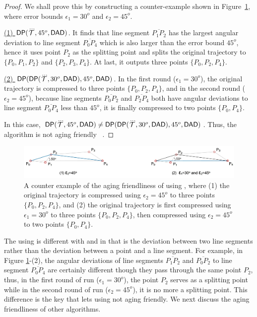 \begin{proof}
	We shall prove this by constructing a counter-example shown in Figure~\ref{fig:aging-dp-dad}, where error bounds $\epsilon_1 =30^o$ and $\epsilon_2=45^o$.
	
	\underline{(1) ${{\mathsf{DP}}}(\dddot{\mathcal{T}}, 45^o, {\mathsf{DAD}})$}. It finds that line segment $\overline{P_1P_2}$ has the largest angular deviation to line segment $\overline{P_0P_4}$ which is also larger than the error bound $45^o$, hence it uses point $P_2$ as the splitting point and splits the original trajectory to $\{P_0, P_1, P_2\}$ and $\{P_2, P_3, P_4\}$. At last, it outputs three points $\{P_0, P_2, P_4\}$.
	
	\underline{(2) ${{\mathsf{DP}}}({\mathsf{DP}}(\dddot{\mathcal{T}}, 30^o, {\mathsf{DAD}}), 45^o, {\mathsf{DAD}})$}. In the first round ($\epsilon_1=30^o$), the original trajectory is compressed to three points $\{P_0, P_2, P_4\}$, and in the second round ($\epsilon_2=45^o$), because line segments  $\overline{P_0P_2}$ and $\overline{P_2P_4}$ both have angular deviations to line segment $\overline{P_0P_4}$ less than $45^o$, it is finally compressed to two points $\{P_0, P_4\}$.
	
	In this case, ${{\mathsf{DP}}}(\dddot{\mathcal{T}}, 45^o, {\mathsf{DAD}}) \ne {{\ensuremath {\mathsf{DP}}}}({\mathsf{DP}}(\dddot{\mathcal{T}}, 30^o, {\mathsf{DAD}}), 45^o, {\mathsf{DAD}})$. Thus, the \dpa algorithm is not aging friendly \wrt~\dad.
\end{proof}

\begin{figure}
	\centering
	\includegraphics[scale=0.66]{Figures/Fig-aging-dp.jpg}
	
	\caption{\small A counter example of the aging friendliness of \dpa using \dad, where (1) the original trajectory is compressed using $\epsilon_2=45^o$ to three points $\{P_0, P_2, P_4\}$, and (2) the original trajectory is first compressed using $\epsilon_1=30^o$ to three points $\{P_0, P_2, P_4\}$, then compressed using $\epsilon_2=45^o$ to two points $\{P_0, P_4\}$. }
	\vspace{-1ex}
	\label{fig:aging-dp-dad}
\end{figure}

The \dpa using \dad is different with \ped and \sed in that \dad is the deviation between two line segments rather than the deviation between a point and a line segment. For example, in Figure \ref{fig:aging-dp-dad}-(2), the angular deviations of line segments $\overline{P_1P_2}$ and $\overline{P_0P_2}$ to line segment $\overline{P_0P_4}$ are certainly different though they pass through the same point $P_2$, thus, in the first round of run ($\epsilon_1=30^o$), the point $P_2$ serves as a splitting point while in the second round of run ($\epsilon_2=45^o$), it is no more a splitting point. This difference is the key that lets \dpa using \dad not aging friendly.
%
We next discuss the aging friendliness of other algorithms.

